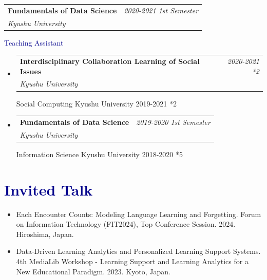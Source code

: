 \documentclass[a4paper,11pt]{article}
\makeatletter
\newcommand{\resumeProject}[4]{
\vspace{0.5mm}\item
    \begin{tabular*}{0.98\textwidth}[t]{l@{\extracolsep{\fill}}r}
        \textbf{#1} & \textit{\footnotesize{#3}} \\
        \footnotesize{\textit{#2}} & \footnotesize{#4}
    \end{tabular*}
    \vspace{-2.4mm}
}
\newcommand{\resumeSubHeadingListStart}{\begin{itemize}[leftmargin=*,labelsep=1mm]}
\newcommand{\resumeSubHeadingListEnd}{\end{itemize}\vspace{2mm}}
\makeatother
\begin{document}
\resumeProject
  {Fundamentals of Data Science}
  {Kyushu University}
  {2020-2021 1st Semester}

\resumeSubHeadingListEnd
\vspace{-0.4mm}

\textcolor{darkblue}{Teaching Assistant}
\vspace{-2mm}
\resumeSubHeadingListStart

\resumeProject
  {Interdisciplinary Collaboration Learning of Social Issues}
  {Kyushu University}
  {2020-2021 *2}

\resumeProject
  {Social Computing}
  {Kyushu University}
  {2019-2021 *2}


\resumeProject
  {Fundamentals of Data Science}
  {Kyushu University}
  {2019-2020 1st Semester}

\resumeProject
  {Information Science}
  {Kyushu University}
  {2018-2020 *5}


\resumeSubHeadingListEnd

\vspace{-4mm}

\section{\textcolor{darkblue}{\textbf{Invited Talk}}}
\resumeSubHeadingListStart
\item Each Encounter Counts: Modeling Language Learning and Forgetting.
Forum on Information Technology (FIT2024), Top Conference Session. 2024. Hiroshima, Japan.
\item Data-Driven Learning Analytics and Personalized Learning Support Systems.
4th MediaLib Workshop - Learning Support and Learning Analytics for a New Educational Paradigm. 2023. Kyoto, Japan.

\resumeSubHeadingListEnd

\end{document}
